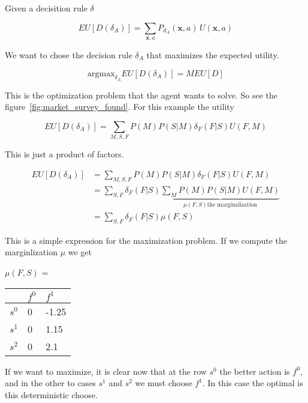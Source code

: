 Given a decisition rule $\delta$

\begin{equation}
 EU[D(\delta_A)] = \sum_{\bm{x},a} P_{d_A}(\bm{x},a) \, U(\bm{x},a)
\end{equation}

We want to chose the decision rule $\delta_A$ that maximizes the expected utility.

\begin{equation}
 \text{argmax}_{\delta_A} EU[D(\delta_A)] = MEU[D]
\end{equation}

This is the optimization problem that the agent wants to solve.
So see the figure~\ref{fig:market_survey_found}. 
For this example the utility 

\begin{equation}
 EU[D(\delta_A)] = \sum_{M,S,F} P(M) P(S|M) \delta_F(F|S) U(F,M)
\end{equation}

This is just a product of factors.

\begin{equation}
\begin{split}
 EU[D(\delta_A)] &=  \sum_{M,S,F} P(M) P(S|M) \delta_F(F|S) U(F,M)  \\
 & = \sum_{S,F} \delta_F(F|S) \underbrace{\sum_{M} P(M) P(S|M) U(F,M)}_{\mu(F,S) \text{the marginalization}} \\[0.3cm]
 & =  \sum_{S,F} \delta_F(F|S) \mu(F,S)
\end{split}
\end{equation}

This is a simple expression for the maximization problem.
If we compute the marginlization $\mu$ we get

\begin{table}[H] \centering
$\mu(F,S)$ =
 \begin{tabular}{|l|l|l|}
 \hline
       & $f^0$ & $f^1$  \\ \hline
 $s^0$ & 0 & -1.25 \\ \hline
 $s^1$ & 0 & 1.15 \\ \hline
 $s^2$ & 0 & 2.1 \\ \hline
 \end{tabular}
\end{table}

If we want to maximize, it is clear now that at the row $s^0$ the better action is $f^0$, and in the other to cases $s^1$ and $s^2$ we must choose $f^1$.
In this case the optimal is this deterministic choose.

